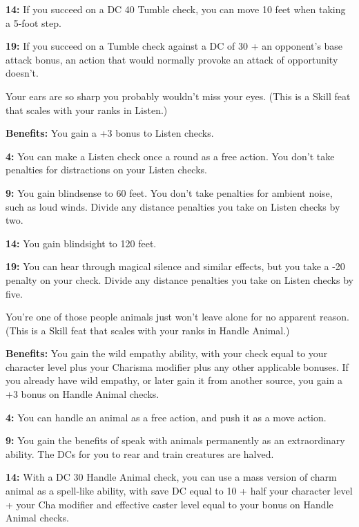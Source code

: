 \textbf{14:} If you succeed on a DC 40 Tumble check, you can move 10 feet when taking a 5-foot step.

\textbf{19:} If you succeed on a Tumble check against a DC of 30 + an opponent's base attack bonus, an action that would normally provoke an attack of opportunity doesn't.


Your ears are so sharp you probably wouldn't miss your eyes. (This is a Skill feat that scales with your ranks in Listen.)

\textbf{Benefits:} You gain a +3 bonus to Listen checks.

\textbf{4:} You can make a Listen check once a round as a free action. You don't take penalties for distractions on your Listen checks.

\textbf{9:} You gain blindsense to 60 feet. You don't take penalties for ambient noise, such as loud winds. Divide any distance penalties you take on Listen checks by two.

\textbf{14:} You gain blindsight to 120 feet.

\textbf{19:} You can hear through magical silence and similar effects, but you take a -20 penalty on your check. Divide any distance penalties you take on Listen checks by five.


You're one of those people animals just won't leave alone for no apparent reason. (This is a Skill feat that scales with your ranks in Handle Animal.)

\textbf{Benefits:} You gain the wild empathy ability, with your check equal to your character level plus your Charisma modifier plus any other applicable bonuses. If you already have wild empathy, or later gain it from another source, you gain a +3 bonus on Handle Animal checks.

\textbf{4:} You can handle an animal as a free action, and push it as a move action.

\textbf{9:} You gain the benefits of speak with animals permanently as an extraordinary ability. The DCs for you to rear and train creatures are halved.

\textbf{14:} With a DC 30 Handle Animal check, you can use a mass version of charm animal as a spell-like ability, with save DC equal to 10 + half your character level + your Cha modifier and effective caster level equal to your bonus on Handle Animal checks.

